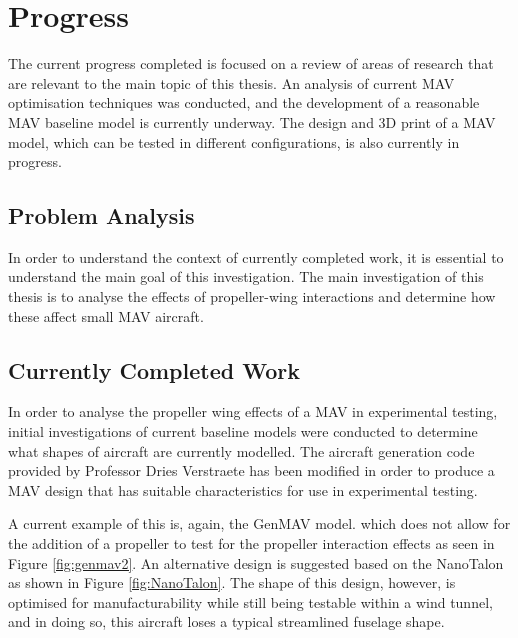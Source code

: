 \graphicspath{{./Figs/}}

\chapter{Progress} 
The current progress completed is focused on a review of areas of research that are relevant to the main topic of this thesis. An analysis of current \acrshort{MAV} optimisation techniques was conducted, and the development of a reasonable \acrshort{MAV} baseline model is currently underway. The design and 3D print of a \acrshort{MAV} model, which can be tested in different configurations, is also currently in progress. 

\section{Problem Analysis}
\label{sec: ProblemAnalysis}
In order to understand the context of currently completed work, it is essential to understand the main goal of this investigation. The main investigation of this thesis is to analyse the effects of propeller-wing interactions and determine how these affect small \acrshort{MAV} aircraft. 

\section{Currently Completed Work}
\label{sec: completedWork}

In order to analyse the propeller wing effects of a \acrshort{MAV} in experimental testing, initial investigations of current baseline models were conducted to determine what shapes of aircraft are currently modelled. The aircraft generation code provided by Professor Dries Verstraete has been modified in order to produce a \acrshort{MAV} design that has suitable characteristics for use in experimental testing.

A current example of this is, again, the \acrshort{GenMAV} model.
\cite{Stewart2007} which does not allow for the addition of a propeller to test for the propeller interaction effects as seen in Figure \ref{fig:genmav2}. An alternative design is suggested based on the NanoTalon as shown in Figure \ref{fig:NanoTalon}. The shape of this design, however, is optimised for manufacturability while still being testable within a wind tunnel, and in doing so, this aircraft loses a typical streamlined fuselage shape. 


